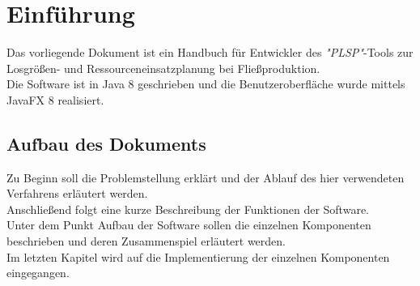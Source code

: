 \documentclass[12pt,a4paper, listof=entryprefix, bibliography=totocnumbered,toc=listofnumbered,lof=listofnumbered]{scrartcl}
\newcounter{verzeichnis}
\begin{document}
\singlespacing %
\setcounter{section}{0}
\setcounter{page}{1}

\tableofcontents %
\pagebreak

\onehalfspacing %
\renewcommand{\thesection}{\arabic{section}} %
\setcounter{page}{1}	%
\setcounter{section}{0}
\renewcommand{\sectionmark}[1]{\markright{#1}} %
\renewcommand{\subsectionmark}[1]{}            %
\renewcommand{\subsubsectionmark}[1]{}         %
\rhead{\rightmark}                             %

\section{Einführung}
Das vorliegende Dokument ist ein Handbuch für Entwickler des \textit{"\gls{PLSP}"}-Tools zur Losgrößen- und Ressourceneinsatzplanung bei Fließproduktion. 
\\
Die Software ist in Java 8 geschrieben und die Benutzeroberfläche wurde mittels JavaFX 8 realisiert.

\subsection{Aufbau des Dokuments}
Zu Beginn soll die Problemstellung erklärt und der Ablauf des hier verwendeten Verfahrens erläutert werden.
\\
Anschließend folgt eine kurze Beschreibung der Funktionen der Software.
\\
Unter dem Punkt Aufbau der Software sollen die einzelnen Komponenten beschrieben und deren Zusammenspiel erläutert werden.
\\
Im letzten Kapitel wird auf die Implementierung der einzelnen Komponenten eingegangen.
\end{document}
